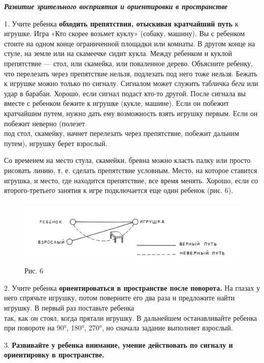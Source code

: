 \documentclass[a5paper]{book}
\renewcommand{\emph}[1]{\textit{#1}}
\begin{document}
\emph{\textbf{Развитие зрительного восприятия и ориентировки в
пространстве}}

1. Учите ребенка \textbf{обходить препятствия, отыскивая кратчайший
путь} к игрушке. Игра «Кто скорее возьмет куклу» (собаку, машину). Вы с
ребенком стоите на одном конце ограниченной площадки или комнаты. В
другом конце на стуле, на земле или на скамеечке сидит кукла. Между
ребенком и куклой препятствие --- стол, или скамейка, или поваленное
дерево. Объясните ребенку, что перелезать через препятствие нельзя,
подлезать под него тоже нельзя. Бежать к игрушке можно только по
сигналу. Сигналом может служить табличка \emph{беги} или удар в барабан.
Хорошо, если сигнал подаст кто-то другой. После сигнала вы вместе с
ребенком бежите к игрушке (кукле, машине). Если он побежит кратчайшим
путем, нужно дать ему возможность взять игрушку первым. Если он побежит
неверно (полезет\\
под стол, скамейку, начнет перелезать через препятствие, побежит дальним
путем), игрушку берет взрослый.

Со временем на место стула, скамейки, бревна можно класть палку или
просто рисовать линию, т. е. сделать препятствие условным. Место, на
которое ставится игрушка, и место, где находится препятствие, все время
менять. Хорошо, если со второго-третьего занятия к игре подключается еще
один ребенок (рис. 6).

\begin{figure}
\centering
\includegraphics[width=4.90972in,height=1.25in]{media/media/image6.jpg}
\caption*{Рис. 6}
\end{figure}

2. Учите ребенка \textbf{ориентироваться в пространстве после поворота.}
На глазах у него спрячьте игрушку, потом поверните его два раза и
предложите найти игрушку. В первый раз поставьте ребенка\\
так, как он стоял, когда прятали игрушку. В дальнейшем останавливайте
ребенка при повороте на 90°, 180°, 270°, но сначала задание выполняет
взрослый.

3. \textbf{Развивайте у ребенка внимание, умение действовать по сигналу
и ориентировку в пространстве.}
\end{document}
